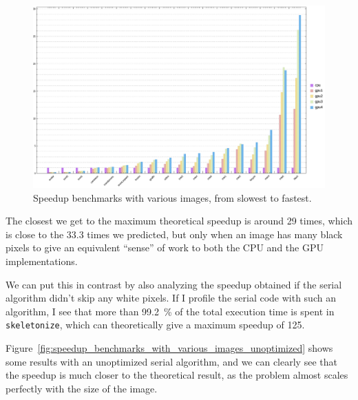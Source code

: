 \documentclass[11pt,a4paper]{article}
\begin{document}
        \begin{figure}[h]
            \centering
            \includegraphics[width=\textwidth]{figs/benchmarks_barplot.pdf}
            \caption{Speedup benchmarks with various images, from slowest to fastest.}
            \label{fig:speedup_benchmarks_with_various_images}
        \end{figure}

        The closest we get to the maximum theoretical speedup is around 29 times, which is close to the 33.3 times we predicted, but only when an image has many black pixels to give an equivalent ``sense'' of work to both the CPU and the GPU implementations.

        We can put this in contrast by also analyzing the speedup obtained if the serial algorithm didn't skip any white pixels. If I profile the serial code with such an algorithm, I see that more than 99.2~\% of the total execution time is spent in \verb+skeletonize+, which can theoretically give a maximum speedup of 125.

        Figure~\ref{fig:speedup_benchmarks_with_various_images_unoptimized} shows some results with an unoptimized serial algorithm, and we can clearly see that the speedup is much closer to the theoretical result, as the problem almost scales perfectly with the size of the image.
\end{document}
